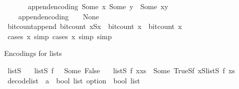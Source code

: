 \begin{isabellebody}
\ \ \isanewline
\ \ \ \ {\isachardoublequoteopen}append{\isacharunderscore}{\kern0pt}encoding\ {\isacharparenleft}{\kern0pt}Some\ x{\isacharparenright}{\kern0pt}\ {\isacharparenleft}{\kern0pt}Some\ y{\isacharparenright}{\kern0pt}\ {\isacharequal}{\kern0pt}\ Some\ {\isacharparenleft}{\kern0pt}x{\isacharat}{\kern0pt}y{\isacharparenright}{\kern0pt}{\isachardoublequoteclose}\ {\isacharbar}{\kern0pt}\isanewline
\ \ \ \ {\isachardoublequoteopen}append{\isacharunderscore}{\kern0pt}encoding\ {\isacharunderscore}{\kern0pt}\ {\isacharunderscore}{\kern0pt}\ {\isacharequal}{\kern0pt}\ None{\isachardoublequoteclose}\isanewline
\isanewline
{}\isamarkupfalse%
\ bit{\isacharunderscore}{\kern0pt}count{\isacharunderscore}{\kern0pt}append{\isacharcolon}{\kern0pt}\ {\isachardoublequoteopen}bit{\isacharunderscore}{\kern0pt}count\ {\isacharparenleft}{\kern0pt}x{}{\isacharat}{\kern0pt}\isactrlsub Sx{}{\isacharparenright}{\kern0pt}\ {\isacharequal}{\kern0pt}\ bit{\isacharunderscore}{\kern0pt}count\ x{}\ {\isacharplus}{\kern0pt}\ bit{\isacharunderscore}{\kern0pt}count\ x{}{\isachardoublequoteclose}\isanewline
%
\isadelimproof
\ \ %
\endisadelimproof
%
\isatagproof
{}\isamarkupfalse%
\ {\isacharparenleft}{\kern0pt}cases\ x{}{\isacharcomma}{\kern0pt}\ simp{\isacharcomma}{\kern0pt}\ cases\ x{}{\isacharcomma}{\kern0pt}\ simp{\isacharcomma}{\kern0pt}\ simp{\isacharparenright}{\kern0pt}%
\endisatagproof
{\isafoldproof}%
%
\isadelimproof
%
\endisadelimproof
%
\begin{isamarkuptext}%
Encodings for lists%
\end{isamarkuptext}\isamarkuptrue%
\isamarkupfalse%
\ list\isactrlsub S\ \isanewline
\ \ {\isachardoublequoteopen}list\isactrlsub S\ f\ {\isacharbrackleft}{\kern0pt}{\isacharbrackright}{\kern0pt}\ {\isacharequal}{\kern0pt}\ Some\ {\isacharbrackleft}{\kern0pt}False{\isacharbrackright}{\kern0pt}{\isachardoublequoteclose}\ {\isacharbar}{\kern0pt}\isanewline
\ \ {\isachardoublequoteopen}list\isactrlsub S\ f\ {\isacharparenleft}{\kern0pt}x{\isacharhash}{\kern0pt}xs{\isacharparenright}{\kern0pt}\ {\isacharequal}{\kern0pt}\ Some\ {\isacharbrackleft}{\kern0pt}True{\isacharbrackright}{\kern0pt}{\isacharat}{\kern0pt}\isactrlsub Sf\ x{\isacharat}{\kern0pt}\isactrlsub Slist\isactrlsub S\ f\ xs{\isachardoublequoteclose}\isanewline
\isanewline
{}\isamarkupfalse%
\ decode{\isacharunderscore}{\kern0pt}list\ {\isacharcolon}{\kern0pt}{\isacharcolon}{\kern0pt}\ {\isachardoublequoteopen}{\isacharparenleft}{\kern0pt}{\isacharprime}{\kern0pt}a\ {\isasymRightarrow}\ bool\ list\ option{\isacharparenright}{\kern0pt}\ {\isasymRightarrow}\ bool\ list\ \isanewline

\end{isabellebody}
